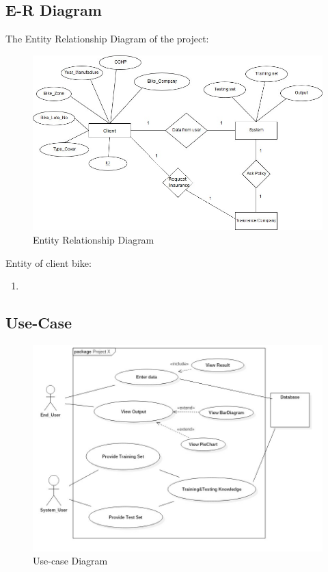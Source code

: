 \subsection{E-R Diagram}
The Entity Relationship Diagram of the project:
\par
\begin{figure}[tbh] %
\begin{large}

	\includegraphics[width=6in]{images/ER.jpg}
	\caption{Entity Relationship Diagram} %
	\label{ER} %
\end{large}
\end{figure}
Entity of client bike:
\begin{enumerate}
\item
\end{enumerate}

\newpage




\newpage
\subsection{Use-Case}
\begin{figure}[tbh] %
\begin{center}
	\includegraphics[width = 6in]{images/uc.jpg}
	\caption{Use-case Diagram} %
	\label{Use-case} %
\end{center}
\end{figure}

